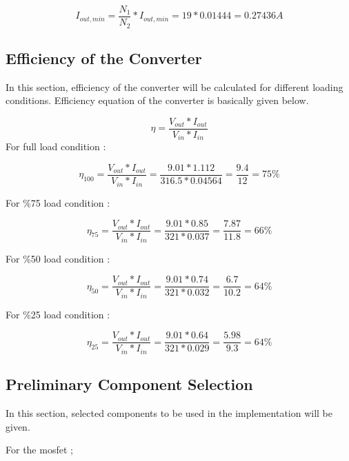 \documentclass[12pt]{article}
\begin{document}
\begin{equation*}
    I_{out,min}= \dfrac{N_{1}}{N_{2}}*I_{out,min}= 19*0.01444 = 0.27436 A
\end{equation*}
       
\subsection{Efficiency of the Converter}

In this section, efficiency of the converter will be calculated for different loading conditions. Efficiency equation of the converter is basically given below. 

\begin{equation*}
    \eta = \dfrac{V_{out}*I_{out}}{V_{in}*I_{in}}
\end{equation*}      
For full load condition :
       
\begin{equation*}
    \eta_{100} = \dfrac{V_{out}*I_{out}}{V_{in}*I_{in}}=\dfrac{9.01*1.112}{316.5*0.04564}= \dfrac{9.4}{12}= 75 \%
\end{equation*} 

For \%75 load condition :
       
\begin{equation*}
    \eta_{75} = \dfrac{V_{out}*I_{out}}{V_{in}*I_{in}}=\dfrac{9.01*0.85}{321*0.037}= \dfrac{7.87}{11.8}= 66 \%
\end{equation*} 

For \%50 load condition :
       
\begin{equation*}
    \eta_{50} = \dfrac{V_{out}*I_{out}}{V_{in}*I_{in}}=\dfrac{9.01*0.74}{321*0.032}= \dfrac{6.7}{10.2}= 64 \%
\end{equation*} 

For \%25 load condition :
       
\begin{equation*}
    \eta_{25} = \dfrac{V_{out}*I_{out}}{V_{in}*I_{in}}=\dfrac{9.01*0.64}{321*0.029}= \dfrac{5.98}{9.3}= 64 \%
\end{equation*} 


\subsection{Preliminary Component Selection}

In this section, selected components to be used in the implementation will be given. 

For the mosfet ;
\end{document}
